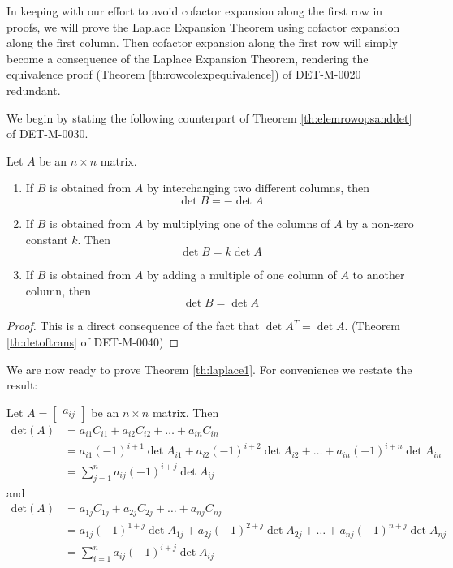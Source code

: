 \documentclass{ximera}
\begin{document}
In keeping with our effort to avoid cofactor expansion along the first row in proofs, we will prove the  Laplace Expansion Theorem using cofactor expansion along the first column.  Then cofactor expansion along the first row will simply become a consequence of the Laplace Expansion Theorem, rendering the equivalence proof (Theorem \ref{th:rowcolexpequivalence}) of DET-M-0020 redundant.

We begin by stating the following counterpart of Theorem \ref{th:elemrowopsanddet} of DET-M-0030.
\begin{theorem}\label{th:elemcolopsanddet}
Let $A$ be an $n\times n$ matrix.  
\begin{enumerate}
\item\label{item:rowswapanddet}
If $B$ is obtained from $A$ by interchanging two different columns, then $$\det{B}=-\det{A}$$
\item \label{item:rowconstantmultanddet}
If $B$ is obtained from $A$ by multiplying one of the columns of $A$ by a non-zero constant $k$.  Then $$\det{B}=k\det{A}$$
\item \label{item:addmultotherrowdet}
If $B$ is obtained from $A$ by adding a multiple of one column of $A$ to another column, then
$$\det{B}=\det{A}$$
\end{enumerate}
\end{theorem}
\begin{proof}
This is a direct consequence of the fact that $\det{A^T}=\det{A}$. (Theorem \ref{th:detoftrans} of DET-M-0040)
\end{proof}

We are now ready to prove Theorem \ref{th:laplace1}.  For convenience we restate the result:


Let $A=\begin{bmatrix}a_{ij}\end{bmatrix}$ be an $n\times n$ matrix.  Then
\begin{align*}
\text{det}(A)&=a_{i1}C_{i1}+a_{i2}C_{i2}+\ldots +a_{in}C_{in}\\
&=a_{i1}(-1)^{i+1}\det{A_{i1}}+a_{i2}(-1)^{i+2}\det{A_{i2}}+\ldots +a_{in}(-1)^{i+n}\det{A_{in}}\\
&=\sum_{j=1}^na_{ij}(-1)^{i+j}\det{A_{ij}}
\end{align*}
and
\begin{align*}
\text{det}(A)&=a_{1j}C_{1j}+a_{2j}C_{2j}+\ldots +a_{nj}C_{nj}\\
&=a_{1j}(-1)^{1+j}\det{A_{1j}}+a_{2j}(-1)^{2+j}\det{A_{2j}}+\ldots +a_{nj}(-1)^{n+j}\det{A_{nj}}\\
&=\sum_{i=1}^na_{ij}(-1)^{i+j}\det{A_{ij}}
\end{align*}
\end{document}
